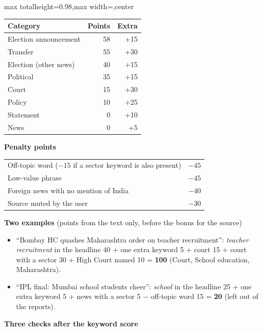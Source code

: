 \documentclass[10pt,a4paper]{article}
\newcommand{\kw}[1]{\textit{#1}}
\newcommand{\lbl}[1]{\textbf{#1}}
\begin{document}
\begin{adjustbox}{max totalheight=0.98\textheight,max width=\textwidth,center}
\begin{minipage}{\textwidth}
\begin{minipage}[t]{0.48\textwidth}
\begin{tabularx}{\linewidth}{@{}Xrr@{}}
\toprule
Category & Points & Extra\\
\midrule
Election announcement & 58 & +15\\
Transfer & 55 & +30\\
Election (other news) & 40 & +15\\
Political & 35 & +15\\
Court & 15 & +30\\
Policy & 10 & +25\\
Statement & 0 & +10\\
News & 0 & +5\\
\bottomrule
\end{tabularx}\par\vspace{7pt}
\lbl{Penalty points}\par\vspace{2pt}
\begin{tabularx}{\linewidth}{@{}Xr@{}}
\toprule
Off-topic word ($-15$ if a sector keyword is also present) & $-45$\\
Low-value phrase & $-45$\\
Foreign news with no mention of India & $-40$\\
Source muted by the user & $-30$\\
\bottomrule
\end{tabularx}
\end{minipage}

\lbl{Two examples} (points from the text only, before the bonus for the source)

\begin{itemize}
  \item ``Bombay HC quashes Maharashtra order on teacher recruitment'': \kw{teacher recruitment} in the headline 40 + one extra keyword 5 + court 15 + court with a sector 30 + High Court named 10 = \lbl{100} (Court, School education, Maharashtra).
  \item ``IPL final: Mumbai school students cheer'': \kw{school} in the headline 25 + one extra keyword 5 + news with a sector 5 $-$ off-topic word 15 = \lbl{20} (left out of the reports).
\end{itemize}

\lbl{Three checks after the keyword score}


\end{minipage}
\end{adjustbox}
\end{document}
